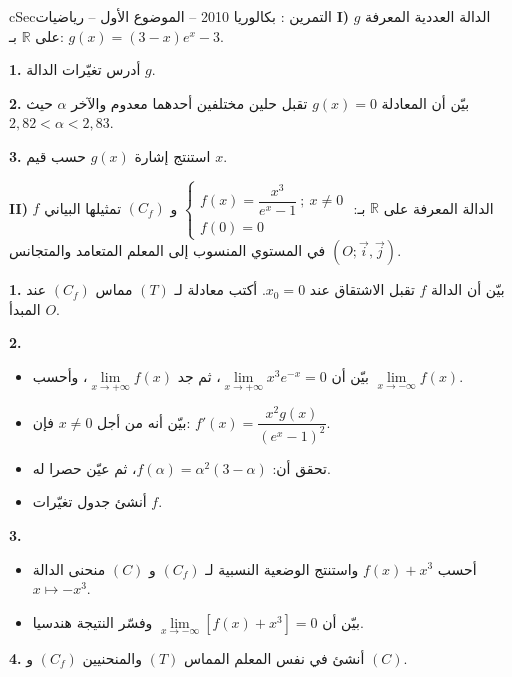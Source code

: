 \documentclass[12pt,a4paper]{article}
\newenvironment{BOX}[2]{\begin{otherlanguage}{english}\begin{arbox}{#1}{#2}}{\end{arbox}\end{otherlanguage}}
\newcounter{exo}
\newenvironment{tamrin}[1]{\stepcounter{exo}\begin{BOX}{cSec}{التمرين \theexo: #1}}{\end{BOX}}
\newcommand{\R}{\mathbb{R}}
\newenvironment{sq}{\begin{itemize}[leftmargin=2.4em,itemsep=3pt]}{\end{itemize}}
\newcommand{\qa}{\item[(أ)]}\newcommand{\qb}{\item[(ب)]}\newcommand{\qc}{\item[(جـ)]}\newcommand{\qd}{\item[(د)]}\newcommand{\qe}{\item[(هـ)]}
\newcommand{\QQ}[1]{\par\smallskip\textbf{#1.} }
\begin{document}
\begin{tamrin}{بكالوريا 2010 -- الموضوع الأول -- رياضيات}
\textbf{I)} $g$ الدالة العددية المعرفة على $\R$ بـ: $g(x)=(3-x)e^{x}-3$.
\QQ{1} أدرس تغيّرات الدالة $g$.
\QQ{2} بيّن أن المعادلة $g(x)=0$ تقبل حلين مختلفين أحدهما معدوم والآخر $\alpha$ حيث $2{,}82<\alpha<2{,}83$.
\QQ{3} استنتج إشارة $g(x)$ حسب قيم $x$.

\textbf{II)} $f$ الدالة المعرفة على $\R$ بـ: $\begin{cases} f(x)=\dfrac{x^3}{e^{x}-1}\ ;\ x\neq0\\[4pt] f(0)=0\end{cases}$
و $(C_f)$ تمثيلها البياني في المستوي المنسوب إلى المعلم المتعامد والمتجانس $(O;\vec i,\vec j)$.
\QQ{1} بيّن أن الدالة $f$ تقبل الاشتقاق عند $x_0=0$. أكتب معادلة لـ $(T)$ مماس $(C_f)$ عند المبدأ $O$.
\QQ{2}
\begin{sq}
\qa بيّن أن $\lim\limits_{x\to+\infty}x^3e^{-x}=0$، ثم جد $\lim\limits_{x\to+\infty}f(x)$، وأحسب $\lim\limits_{x\to-\infty}f(x)$.
\qb بيّن أنه من أجل $x\neq0$ فإن: $f'(x)=\dfrac{x^2g(x)}{(e^{x}-1)^2}$.
\qc تحقق أن: $f(\alpha)=\alpha^2(3-\alpha)$، ثم عيّن حصرا له.
\qd أنشئ جدول تغيّرات $f$.
\end{sq}
\QQ{3}
\begin{sq}
\qa أحسب $f(x)+x^3$ واستنتج الوضعية النسبية لـ $(C_f)$ و $(C)$ منحنى الدالة $x\mapsto-x^3$.
\qb بيّن أن $\lim\limits_{x\to-\infty}\left[f(x)+x^3\right]=0$ وفسّر النتيجة هندسيا.
\end{sq}
\QQ{4} أنشئ في نفس المعلم المماس $(T)$ والمنحنيين $(C_f)$ و $(C)$.
\end{tamrin}
\end{document}
